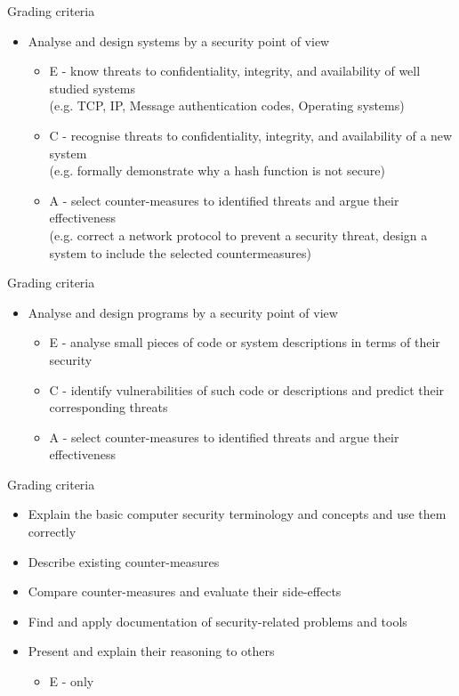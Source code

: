 \documentclass{beamer}
\begin{document}
\begin{frame}{Grading criteria}
  \begin{itemize}
  \item Analyse and design systems by a security point of view
    \begin{itemize}
    \item E - know threats to confidentiality, integrity,
      and availability of well studied systems\\
      (e.g. TCP, IP, Message authentication codes, Operating systems)
    \item C - recognise threats to confidentiality, integrity, and
      availability of a new system\\ (e.g. formally demonstrate why a
      hash function is not secure)
    \item A - select counter-measures to identified threats and argue
      their effectiveness\\
      (e.g. correct a network protocol to prevent a security threat,
      design a system to include the selected countermeasures)
    \end{itemize}
  \end{itemize}
\end{frame}

\begin{frame}{Grading criteria}
  \begin{itemize}
  \item Analyse and design programs by a security point of view
    \begin{itemize}
    \item E - analyse small pieces of code or system descriptions in
      terms of their security
    \item C - identify vulnerabilities of such code or descriptions
      and predict their corresponding threats
    \item A - select counter-measures to identified threats and argue
      their effectiveness
    \end{itemize}
  \end{itemize}
\end{frame}

\begin{frame}{Grading criteria}
  \begin{itemize}
    \item Explain the basic computer security terminology and concepts and use them correctly
    \item Describe existing counter-measures
    \item Compare counter-measures and evaluate their side-effects
    \item Find and apply documentation of security-related problems and tools
    \item Present and explain their reasoning to others
    \begin{itemize}
    \item E - only
    \end{itemize}
  \end{itemize}
\end{frame}
\end{document}
